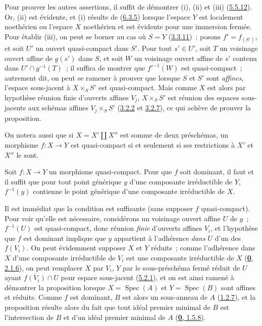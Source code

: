 Pour prouver les autres assertions, il suffit de démontrer (i), (ii) et (iii)
(\hyperref[I.5.5.12-fr]{5.5.12}). Or, (ii) est évidente, et (i) résulte de
(\hyperref[I.6.3.5-fr]{6.3.5}) lorsque l'espace $Y$ est localement noethérien
ou l'espace $X$ noethérien et est évidente pour une immersion fermée. Pour
établir (iii),
on peut se borner au cas où $S=Y$ (\hyperref[I.3.3.11-fr]{3.3.11})~; posons
$f'=f_{(S')}$, et soit $U'$ un ouvert quasi-compact dans $S'$. Pour tout
$s'\in U'$, soit $T$ un voisinage ouvert affine de $g(s')$ dans $S$, et soit
$W$ un voisinage ouvert affine de $s'$ contenu dans
$U'\cap g^{-1}(T)$~; il suffira de montrer que $f'^{-1}(W)$ est
quasi-compact~; autrement dit, on peut se ramener à prouver que lorsque $S$
et $S'$ sont \emph{affines}, l'espace sous-jacent à $X\times_S S'$ est
quasi-compact. Mais comme $X$ est alors par hypothèse réunion finie d'ouverts
affines $V_j$, $X\times_S S'$ est réunion des espaces sous-jacents aux
schémas affines $V_j\times_S S'$
(\hyperref[I.3.2.2-fr]{3.2.2} et \hyperref[I.3.2.7-fr]{3.2.7}), ce qui achève
de prouver la proposition.

On notera aussi que si $X=X'\amalg X''$ est somme de deux préschémas, un
morphisme $f:X\to Y$ est quasi-compact si et seulement si ses restrictions à
$X'$ et $X''$ le sont.

\begin{proposition}[6.6.5]
\label{I.6.6.5-fr}
Soit $f:X\to Y$ un morphisme quasi-compact. Pour que $f$ soit dominant, il
faut et il suffit que pour tout point générique $y$ d'une composante
irréductible de $Y$, $f^{-1}(y)$ contienne le point générique d'une composante
irréductible de $X$.
\end{proposition}

Il est immédiat que la condition est suffisante (sans supposer $f$
quasi-compact). Pour voir qu'elle est nécessaire, considérons un voisinage
ouvert affine $U$ de $y$~; $f^{-1}(U)$ est quasi-compact, donc réunion
\emph{finie} d'ouverts affines $V_i$, et l'hypothèse que $f$ est dominant
implique que $y$ appartient à l'adhérence \emph{dans} $U$ d'un des $f(V_i)$. On peut
évidemment supposer $X$ et $Y$ réduits~; comme l'adhérence dans $X$ d'une
composante irréductible de $V_i$ est une composante irréductible de $X$
(\hyperref[0.2.1.6-fr]{\textbf{0}, 2.1.6}), on peut remplacer $X$ par $V_i$, $Y$ par
le sous-préschéma fermé réduit de $U$ ayant $\overline{f(V_i)}\cap U$ pour
espace sous-jacent (\hyperref[I.5.2.1-fr]{5.2.1}), et on est ainsi ramené à
démontrer la proposition lorsque $X=\operatorname{Spec}(A)$ et
$Y=\operatorname{Spec}(B)$ sont affines et réduits. Comme $f$ est dominant,
$B$ est alors un sous-anneau de $A$ (\hyperref[I.1.2.7-fr]{1.2.7}), et la
proposition résulte alors du fait que tout idéal premier minimal de $B$ est
l'intersection de $B$ et d'un idéal premier minimal de $A$
(\hyperref[0.1.5.8-fr]{\textbf{0}, 1.5.8}).

